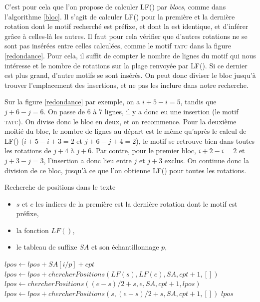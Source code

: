 C'est pour cela que l'on propose de calculer LF() par \textit{blocs}, comme dans l'algorithme \ref{bloc}. Il s'agit de calculer LF() pour la première et la dernière rotation dont le motif recherché est préfixe, et dont la \kbwt est identique, et d'inférer grâce à celles-là les autres. Il faut pour cela vérifier que d'autres rotations ne se sont pas insérées entre celles calculées, comme le motif \textsc{tatc} dans la figure \ref{redondance}. Pour cela, il suffit de compter le nombre de lignes du motif qui nous intéresse et le nombre de rotations sur la plage renvoyée par LF(). Si ce dernier est plus grand, d'autre motifs se sont insérés. On peut donc diviser le bloc jusqu'à trouver l'emplacement des insertions, et ne pas les inclure dans notre recherche.

Sur la figure \ref{redondance} par exemple, on a $i+5 - i = 5$, tandis que $j+6 - j = 6$. On passe de 6 à 7 lignes, il y a donc eu une insertion (le motif \textsc{tatc}). On divise donc le bloc en deux, et on recommence. Pour la deuxième moitié du bloc, le nombre de lignes au départ est le même qu'après le calcul de LF() ($i+5 - i+3 = 2$ et $j+6 - j+4 = 2$), le motif se retrouve bien dans toutes les rotations de $j+4$ à $j+6$. Par contre, pour le premier bloc, $i+2 - i = 2$ et $j+3 - j = 3$, l'insertion a donc lieu entre $j$ et $j+3$ exclus. On continue donc la division de ce bloc, jusqu'à ce que l'on obtienne LF() pour toutes les rotations.


\begin{algorithm}
\caption{Recherche de positions dans le texte}	
\label{bloc}	
	\begin{algorithmic}
	\REQUIRE 
		\begin{itemize}
			\item $s$ et $e$ les indices de la première est la dernière rotation dont le motif est préfixe, 
			\item la fonction $LF()$, 
			\item le tableau de suffixe $SA$ et son échantillonnage $p$, 
		\end{itemize}

		\STATE $lpos \gets lpos + SA[i/p] + cpt$
	\ENDFOR
		\STATE $lpos \gets lpos + chercherPositions(LF(s), LF(e), SA, cpt+1, [])$
	\ELSE
		\STATE $lpos \gets chercherPositions((e-s)/2 +s, e, SA, cpt+1, lpos)$
		\STATE $lpos \gets lpos + chercherPositions(s, (e-s)/2 +s, SA, cpt+1, [])$
	\ENDIF
	\RETURN $lpos$
	\end{algorithmic}
\end{algorithm}



